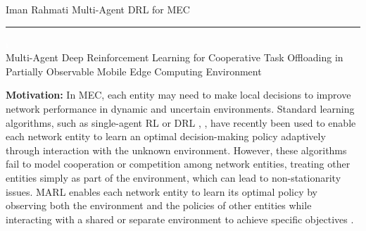 \documentclass[12pt]{article}
\begin{document}
	

	
%



\begin{center} 
	
	
	\vspace{-17mm}
	
	\large Iman Rahmati  \hfill Multi-Agent DRL for MEC\vspace{1mm} \hrule
	
	\vspace{-1mm}
	
	\textcolor{white}{i} \\ \LARGE Multi-Agent Deep Reinforcement Learning for Cooperative Task Offloading in Partially Observable Mobile Edge Computing Environment \vspace{6mm}\\
	
	
\end{center}
 \small
\vspace{-5mm}

\noindent\textbf{\large Motivation:  }
\noindent
In MEC, each entity may need to make local decisions to improve network performance in dynamic and uncertain environments. Standard learning algorithms, such as single-agent RL or DRL \cite{liao2023online}, \cite{huang2019deep}, have recently been used to enable each network entity to learn an optimal decision-making policy adaptively through interaction with the unknown environment. However, these algorithms fail to model cooperation or competition among network entities, treating other entities simply as part of the environment, which can lead to non-stationarity issues. MARL enables each network entity to learn its optimal policy by observing both the environment and the policies of other entities while interacting with a shared or separate environment to achieve specific objectives \cite{zhang2021multi}.



\end{document}
